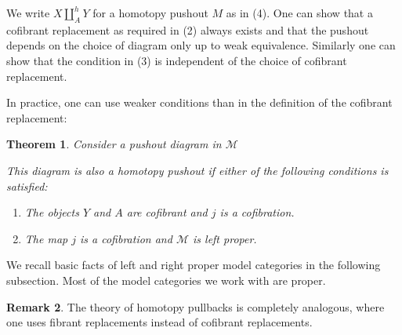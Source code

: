 \documentclass{scrartcl}
\theoremstyle{plain}
\newtheorem{theorem}{Theorem}[section]
\theoremstyle{definition}
\newtheorem{remark}[theorem]{Remark}
\newcommand{\cat}[1]{\mathcal{#1}}
\newcommand{\from}{\leftarrow}
\DeclareMathOperator{\colim}{colim}
\renewcommand{\coprod}{\mathbin{\amalg}}
\begin{document}
We write $X\coprod^h_A Y$ for a homotopy pushout $M$ as in (4).
One can show that a cofibrant replacement as required in (2) always exists and that the pushout depends on the choice of diagram only up to weak equivalence. Similarly one can show that the condition in (3) is independent of the choice of cofibrant replacement.

In practice, one can use weaker conditions than in the definition of the cofibrant replacement:

\begin{theorem}\label{thm:homotopy_pushout_sufficient}
    Consider a pushout diagram in $\cat M$
    
    \begin{center}
    \end{center}

    This diagram is also a homotopy pushout if either of the following conditions is satisfied:
    \begin{enumerate}
        \item The objects $Y$ and $A$ are cofibrant and $j$ is a cofibration.
        \item The map $j$ is a cofibration and $\cat M$ is left proper.
    \end{enumerate}
\end{theorem}

We recall basic facts of left and right proper model categories in the following subsection. Most of the model categories we work with are proper. 

\begin{remark}
The theory of homotopy pullbacks is completely analogous, where one uses fibrant replacements instead of cofibrant replacements. 
\end{remark}

\end{document}
